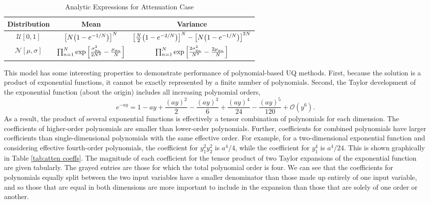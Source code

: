\begin{table}[H]
  \centering
  \begin{tabular}{c|c|c}
    Distribution & Mean & Variance \\\hline
    $\mathcal{U}[0,1]$ & $\qty[N\qty(1-e^{-1/N})]^N$ & $\qty[\frac{N}{2}\qty(1-e^{-2/N})]^N -
                       \qty[N\qty(1-e^{-1/N})]^{2N}$ \\
    $\mathcal{N}[\mu,\sigma]$ & $\prod_{n=1}^N \exp\qty[\frac{\sigma_{y_n}^2}{2N^2}-\frac{\mu_{y_n}}{N}]$
    & $\prod_{n=1}^N \exp\qty[\frac{2\sigma_{y_n}^2}{N^2} - \frac{2\mu_{y_n}}{N}]$
  \end{tabular}
  \caption{Analytic Expressions for Attenuation Case}
  \label{tab:attenuation moments}
\end{table}

This model has some interesting properties to demonstrate performance of polynomial-based UQ methods.  First,
because the solution is a product of exponential functions, it cannot be exactly represented by a finite
number of polynomials.  Second, the Taylor development of the exponential function (about the origin) 
includes all increasing polynomial orders,
\begin{equation}
e^{-ay} = 1 - ay + \frac{(ay)^2}{2} - \frac{(ay)^3}{6} + \frac{(ay)^4}{24} - \frac{(ay)^5}{120} + \mathcal{O}(y^6).
\end{equation}
As a result, the product of several exponential functions is effectively a tensor combination of
polynomials for each dimension.  The coefficients of higher-order polynomials are smaller than lower-order
polynomials.  Further, coefficients for combined polynomials 
have larger coefficients than single-dimensional
polynomials with the same effective order.  For example, for a two-dimensional exponential function and
considering effective fourth-order polynomials, the coefficient for $y_1^2y_2^2$ is $a^4/4$, while the
coefficient for $y_1^4$ is $a^4/24$.  This is shown graphically in Table \ref{tab:atten coeffs}.  The
magnitude of each coefficient for the tensor product of two Taylor expansions of the exponential function are
given tabularly.  The grayed entries are those for which the total polynomial order is four.  We can see
that the coefficients for polynomials equally split between the two input variables have a smaller denominator than
those made up entirely of one input variable, and so those that are equal in both dimensions are more
important to include in the expansion than those that are solely of one order or another.
